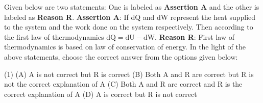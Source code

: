 \item Given below are two statements: One is labeled as \textbf{Assertion A} and the other is labeled as \textbf{Reason R}. 
\newline
\textbf{Assertion A}: If dQ and dW represent the heat supplied to the system and the work done on the system respectively. Then according to the first law of thermodynamics \( \mathrm{dQ = dU - dW} \).
\newline
\textbf{Reason R}: First law of thermodynamics is based on law of conservation of energy.
\newline
In the light of the above statements, choose the correct answer from the options given below:
\begin{tasks}(1)
    \task (A) A is not correct but R is correct
    \task (B) Both A and R are correct but R is not the correct explanation of A
    \task (C) Both A and R are correct and R is the correct explanation of A
    \task (D) A is correct but R is not correct
\end{tasks}